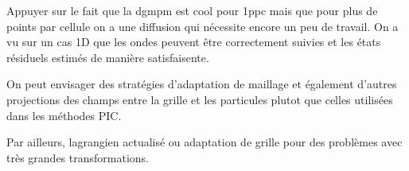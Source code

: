 Appuyer sur le fait que la dgmpm est cool pour 1ppc mais que pour plus de points par cellule on a une diffusion qui nécessite encore un peu de travail.
On a vu sur un cas 1D que les ondes peuvent être correctement suivies et les états résiduels estimés de manière satisfaisente.


On peut envisager des stratégies d'adaptation de maillage et également d'autres projections des champs entre la grille et les particules plutot que celles utilisées dans les méthodes PIC.

Par ailleurs, lagrangien actualisé ou adaptation de grille pour des problèmes avec très grandes transformations.

